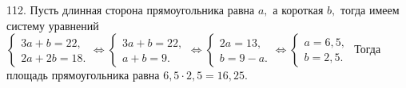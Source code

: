 112. Пусть длинная сторона прямоугольника равна $a,$ а короткая $b,$ тогда имеем систему уравнений $\begin{cases} 3a+b=22,\\ 2a+2b=18.\end{cases}\Leftrightarrow
\begin{cases} 3a+b=22,\\ a+b=9.\end{cases}\Leftrightarrow
\begin{cases} 2a=13,\\ b=9-a.\end{cases}\Leftrightarrow
\begin{cases} a=6,5,\\ b=2,5.\end{cases}$ Тогда площадь прямоугольника равна $6,5\cdot2,5=16,25.$\\
